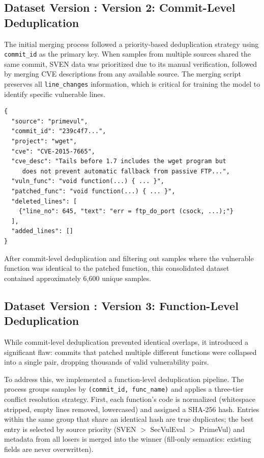 \documentclass[12pt,a4paper]{article}
\makeatletter
\newcounter{DataVer}
\newcommand{\dataversion}[2]{%
  \stepcounter{DataVer}%
  \subsection{Dataset Version \theDataVer: #1}%
  \protected@edef\@currentlabel{\theDataVer}\label{#2}%
}
\makeatother
\begin{document}
\dataversion{Version 2: Commit-Level Deduplication}{ver:data_commit}
The initial merging process followed a priority-based deduplication strategy using \texttt{commit\_id} as the primary key. When samples from multiple sources shared the same commit, SVEN data was prioritized due to its manual verification, followed by merging CVE descriptions from any available source. The merging script preserves all \texttt{line\_changes} information, which is critical for training the model to identify specific vulnerable lines.

\begin{lstlisting}[caption={Example of a merged dataset entry (structure)}]
{
  "source": "primevul",
  "commit_id": "239c4f7...",
  "project": "wget",
  "cve": "CVE-2015-7665",
  "cve_desc": "Tails before 1.7 includes the wget program but 
     does not prevent automatic fallback from passive FTP...",
  "vuln_func": "void function(...) { ... }",
  "patched_func": "void function(...) { ... }",
  "deleted_lines": [
    {"line_no": 645, "text": "err = ftp_do_port (csock, ...);"}
  ],
  "added_lines": []
}
\end{lstlisting}

After commit-level deduplication and filtering out samples where the vulnerable function was identical to the patched function, this consolidated dataset contained approximately 6,600 unique samples.

\dataversion{Version 3: Function-Level Deduplication}{ver:data_func}
While commit-level deduplication prevented identical overlaps, it introduced a significant flaw: commits that patched multiple different functions were collapsed into a single pair, dropping thousands of valid vulnerability pairs.

To address this, we implemented a function-level deduplication pipeline. The process groups samples by \texttt{(commit\_id, func\_name)} and applies a three-tier conflict resolution strategy. First, each function's code is normalized (whitespace stripped, empty lines removed, lowercased) and assigned a SHA-256 hash. Entries within the same group that share an identical hash are true duplicates; the best entry is selected by source priority (SVEN $>$ SecVulEval $>$ PrimeVul) and metadata from all losers is merged into the winner (fill-only semantics: existing fields are never overwritten).
\end{document}
